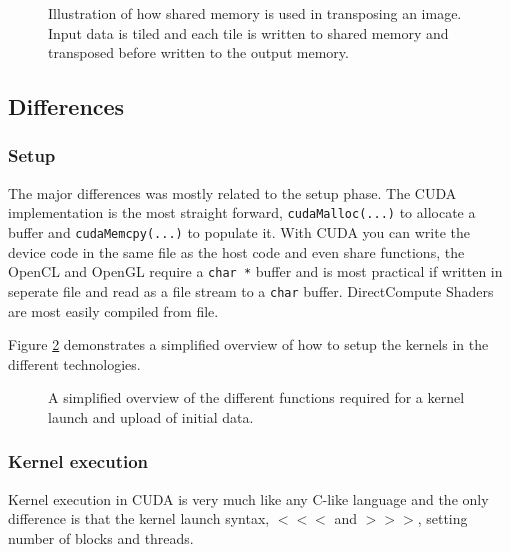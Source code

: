\begin{figure}[h!]
	\centering
	
	\caption{Illustration of how shared memory is used in transposing an image. Input data is tiled and each tile is written to shared memory and transposed before written to the output memory. }
	\label{fig:transpose-memory}
\end{figure}

\subsection{Differences}

\subsubsection{Setup}

The major differences was mostly related to the setup phase. The CUDA implementation is the most straight forward, \texttt{cudaMalloc(...)} to allocate a buffer and \texttt{cudaMemcpy(...)} to populate it. With CUDA you can write the device code in the same file as the host code and even share functions, the OpenCL and OpenGL require a \texttt{char *} buffer and is most practical if written in seperate file and read as a file stream to a \texttt{char} buffer. DirectCompute Shaders are most easily compiled from file.

Figure \ref{fig:code:setup} demonstrates a simplified overview of how to setup the kernels in the different technologies.
\begin{figure}
	\centering	
	\hfill
	\newline
	\hfill
	\caption{A simplified overview of the different functions required for a kernel launch and upload of initial data. }		
	\label{fig:code:setup}
\end{figure}

\subsubsection{Kernel execution}

Kernel execution in CUDA is very much like any C-like language and the only difference is that the kernel launch syntax, $<<<$ and $>>>$, setting number of blocks and threads.


